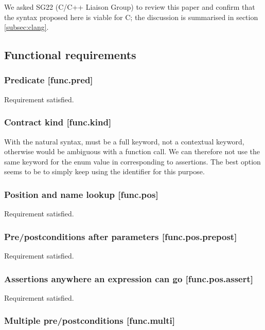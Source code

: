 We asked SG22 (C/C++ Liaison Group) to review this paper and confirm that the syntax proposed here is viable for C; the discussion is summarised in section \ref{subsec:clang}.

\subsection{Functional requirements}

\subsubsection{Predicate  [func.pred]}

Requirement satisfied.

\subsubsection{Contract kind  [func.kind]}

With the natural syntax,  must be a full keyword, not a contextual keyword, otherwise  would be ambiguous with a function call. We can therefore not use the same keyword for the enum value in  corresponding to assertions. The best option seems to be to simply keep using the identifier  for this purpose.

\subsubsection{Position and name lookup [func.pos]}

Requirement satisfied.

\subsubsection{Pre/postconditions after parameters [func.pos.prepost]}

Requirement satisfied.

\subsubsection{Assertions anywhere an expression can go [func.pos.assert]}

Requirement satisfied.

\subsubsection{Multiple pre/postconditions  [func.multi]}

